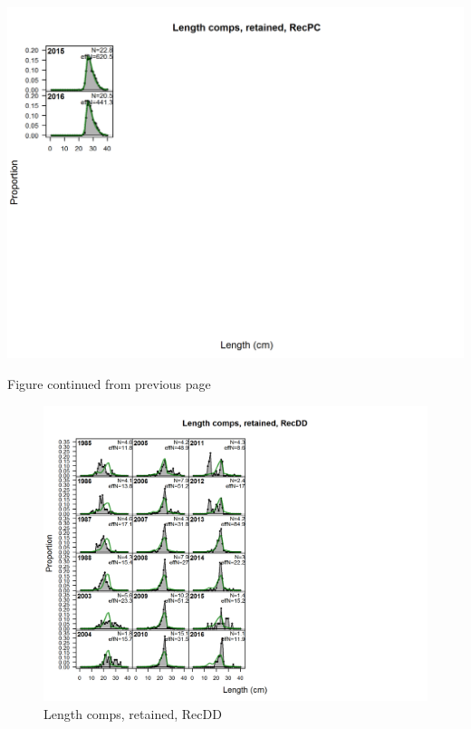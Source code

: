 \documentclass[12pt,]{article}
\begin{document}
\includegraphics{./r4ss/plots_mod1/comp_lenfit_flt5mkt2_page2.png}

\begin{center} 

              Figure continued from previous page 

             \end{center}

\begin{figure}[htbp]
\centering
\includegraphics{./r4ss/plots_mod1/comp_lenfit_flt6mkt2.png}
\caption{Length comps, retained, RecDD
\label{fig:mod1_7_comp_lenfit_flt6mkt2}}
\end{figure}
\end{document}
